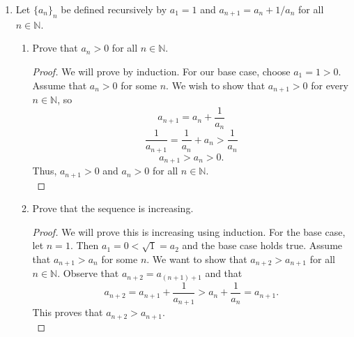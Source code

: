 \documentclass{article}
\begin{document}
\begin{enumerate}
\begin{enumerate}
                \item Prove that $\{a_n\}_n$ converges and find its limit.
                    \begin{proof}
                        Because we have already proven that $\{a_n\}_n$ is monotone and bounded, then $\{a_n\}_n$ is convergent by the monotone convergence theorem.\\
                        Let $l = \lim a_n$. Passing at the limit with $n \to \infty$ in $a_{n+1} = \sqrt{1+a_n}$, we get $l = \sqrt{1+l}$ and so
                            \[l^2 = 1+l\]
                            \[l^2-l-1 = 0.\]
                        So we obtain $l_1 = \frac{1+\sqrt{5}}{2}$ and $l_2 = \frac{1-\sqrt{5}}{2}$, however we know from (b) that $0 \leq a_n \leq 2$, so $0 \leq l \leq 2$. Since $l_2 < 0$, $\lim a_n = \frac{1+\sqrt{5}}{2}$.\\
                    \end{proof}
            \end{enumerate}
        \item Let $\{a_n\}_n$ be defined recursively by $a_1 = 1$ and $a_{n+1} = a_n +1/a_n$ for all $n \in \mathbb{N}$.
            \begin{enumerate}
                \item Prove that $a_n > 0$ for all $n \in \mathbb{N}$.
                    \begin{proof}
                        We will prove by induction. For our base case, choose $a_1 = 1 > 0$. Assume that $a_n > 0$ for some $n$. We wish to show that $a_{n+1} > 0$ for every $n \in \mathbb{N}$, so
                            \[a_{n+1} = a_n+\frac{1}{a_n}\]
                            \[\frac{1}{a_{n+1}} = \frac{1}{a_n}+a_n > \frac{1}{a_n}\]
                            \[a_{n+1} > a_n > 0.\]
                        Thus, $a_{n+1} > 0$ and $a_n > 0$ for all $n \in \mathbb{N}$.\\
                    \end{proof}
                
                \item Prove that the sequence is increasing.
                    \begin{proof}
                        We will prove this is increasing using induction. For the base case, let $n = 1$. Then $a_1 = 0 < \sqrt{1} = a_2$ and the base case holds true. Assume that $a_{n+1} > a_n$ for some $n$. We want to show that $a_{n+2} > a_{n+1}$ for all $n \in \mathbb{N}$. Observe that $a_{n+2} = a_{(n+1)+1}$ and that
                            \[a_{n+2} = a_{n+1}+\frac{1}{a_{n+1}} > a_n+\frac{1}{a_n} = a_{n+1}.\]
                        This proves that $a_{n+2} > a_{n+1}$.\\
                    \end{proof}
                

\end{enumerate}
\end{enumerate}
\end{document}
